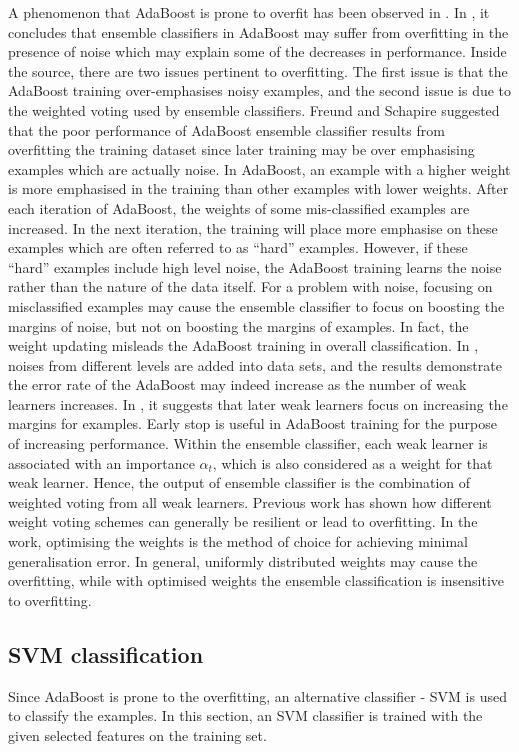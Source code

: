 \documentclass[a4paper,10pt]{article}
\begin{document}
A phenomenon that AdaBoost is prone to overfit has been observed in \cite{Grove1998,Mason1999}. In \cite{Opitz1999}, it concludes that ensemble classifiers in AdaBoost may suffer from overfitting in the presence of noise which may explain some of the decreases in performance. Inside the source, there are two issues pertinent to overfitting. The first issue is that the AdaBoost training over-emphasises noisy examples, and the second issue is due to the weighted voting used by ensemble classifiers. Freund and Schapire \cite{Freund1996} suggested that the poor performance of AdaBoost ensemble classifier results from overfitting the training dataset since later training may be over emphasising examples which are actually noise. In AdaBoost, an example with a higher weight is more emphasised in the training than other examples with lower weights. After each iteration of AdaBoost, the weights of some mis-classified examples are increased. In the next iteration, the training will place more emphasise on these examples which are often referred to as ``hard'' examples. However, if these ``hard'' examples include high level noise, the AdaBoost training learns the noise rather than the nature of the data itself. For a problem with noise, focusing on misclassified examples may cause the ensemble classifier to focus on boosting the margins of noise, but not on boosting the margins of examples. In fact, the weight updating misleads the AdaBoost training in overall classification. In \cite{Opitz1999}, noises from different levels are added into data sets, and the results demonstrate the error rate of the AdaBoost may indeed increase as the number of weak learners increases. In \cite{Schapire1997}, it suggests that later weak learners focus on increasing the margins for examples. Early stop is useful in AdaBoost training for the purpose of increasing performance. Within the ensemble classifier, each weak learner is associated with an importance $\alpha_t$, which is also considered as a weight for that weak learner. Hence, the output of ensemble classifier is the combination of weighted voting from all weak learners. Previous work \cite{Sollich1995} has shown how different weight voting schemes can generally be resilient or lead to overfitting. In the work, optimising the weights is the method of choice for achieving minimal generalisation error. In general, uniformly distributed weights may cause the overfitting, while with optimised weights the ensemble classification is insensitive to overfitting.


\subsection{SVM classification}
Since AdaBoost is prone to the overfitting, an alternative classifier - SVM is used to classify the examples. In this section, an SVM classifier is trained with the given selected features on the training set.
\end{document}
